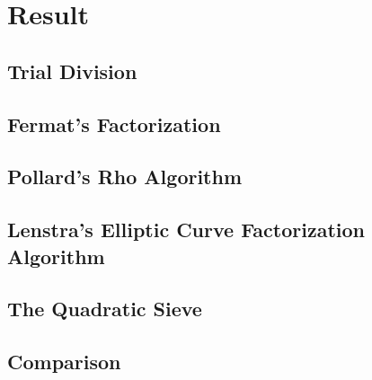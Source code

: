 \chapter{Result}

\section{Trial Division}
\label{TrialDivision}
%

\section{Fermat's Factorization}
\label{FermatsFactorization}
%

\section{Pollard's Rho Algorithm}
\label{PollardsRhoAlgorithm}
%

\section{Lenstra's Elliptic Curve Factorization Algorithm}
\label{LenstrasEllipticCurve}
%

\section{The Quadratic Sieve}
\label{QuadraticSieve}
%

\section{Comparison}
\label{Comparison}
%